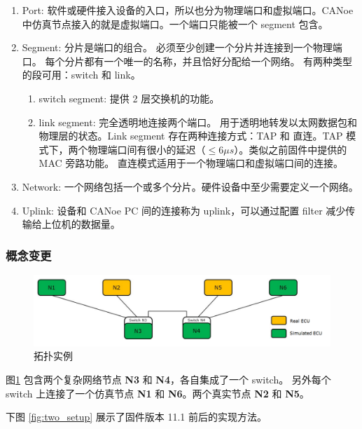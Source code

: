 \begin{enumerate}
    \item Port: 软件或硬件接入设备的入口，所以也分为物理端口和虚拟端口。CANoe 中仿真节点接入的就是虚拟端口。一个端口只能被一个 segment 包含。
    \item Segment: 分片是端口的组合。 必须至少创建一个分片并连接到一个物理端口。 每个分片都有一个唯一的名称，并且恰好分配给一个网络。 有两种类型的段可用：switch 和 link。 
    \begin{enumerate}
        \item switch segment: 提供 2 层交换机的功能。
        \item link segment: 完全透明地连接两个端口。 用于透明地转发以太网数据包和物理层的状态。Link segment 存在两种连接方式：TAP 和 直连。TAP 模式下，两个物理端口间有很小的延迟（$\leq 6 \mu s$）。类似之前固件中提供的 MAC 旁路功能。
        直连模式适用于一个物理端口和虚拟端口间的连接。
    \end{enumerate}

    \item Network: 一个网络包括一个或多个分片。硬件设备中至少需要定义一个网络。
    \item Uplink: 设备和 CANoe PC 间的连接称为 uplink，可以通过配置 filter 减少传输给上位机的数据量。
\end{enumerate}

\subsubsection{概念变更}

\begin{figure}[ht]
    \centering
    \includegraphics[scale=0.7]{pic/Snipaste_2021-10-29_14-37-48.png}
    \caption{拓扑实例}
    \label{fig:example_topology}
\end{figure}
图\ref{fig:example_topology} 包含两个复杂网络节点 \textbf{N3} 和 \textbf{N4}，各自集成了一个 switch。
另外每个 switch 上连接了一个仿真节点 \textbf{N1} 和  \textbf{N6}。两个真实节点  \textbf{N2} 和  \textbf{N5}。

下图 \ref{fig:two_setup} 展示了固件版本 11.1 前后的实现方法。

